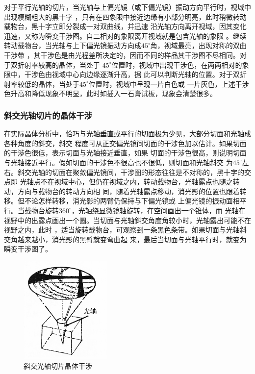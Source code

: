\documentclass[11pt,a4paper]{article}
\begin{document}
\begin{spacing}{1.3}
\begin{CJK*}{UTF8}{gbsn}
对于平行光轴的切片，当光轴与上偏光镜（或下偏光镜）振动方向平行时，视域中出现模糊粗大的黑十字
，只有在四象限中接近边缘有小部分明亮，此时稍微转动载物台，黑十字立即分裂成一对双曲线，并迅速
沿光轴方向离开视域，因其变化迅速，又称为瞬变干涉图。自二相对的象限离开视域就是包含光轴的象限
。继续转动载物台，当光轴与上下偏光镜振动方向成$45^{\circ}$角，视域最亮，出现对称的双曲干涉带
，其干涉色是由光程差所决定的，因而不同的样品其干涉图不尽相同。对于双折射率较高的晶体，当处于
$45^{\circ}$位置时，视域中出现干涉色，在两两相对的象限中，干涉色由视域中心向边缘逐渐升高，据
此可以判断光轴的位置。对于双折射率较低的晶体，当处于$45^{\circ}$位置时，视域中呈现一片白色或
一片灰色，上述干涉色升高和降低现象不明显，此时如插入一石膏试板，现象会清楚很多。\par
\subsubsection{斜交光轴切片的晶体干涉}
在实际晶体分析中，恰巧与光轴垂直或平行的切面极为少见，大部分切面和光轴成各种角度的斜交，斜交
程度可从正交偏光镜间切面的干涉色加以估计。如果切面的干涉色很低，表示切面与光轴接近垂直，如果
切面的干涉色很高，则说明切面与光轴接近平行。假如切面的干涉色不很高也不很低，则切面和光轴斜交
为$45^{\circ}$左右。斜交光轴的切面在聚敛偏光镜间，干涉图的形态往往是不对称的，黑十字的交点即
光轴点不在视域中心，但仍在视域之内，转动载物台，光轴露点也随之转动，方向与载物台的转动方向相
同，随着光轴露点移动，消光影的位置也跟着转移。但不论怎样转移，消光影的两臂仍保持与下偏光镜或
上偏光镜的振动面相平行。当载物台旋转$360^{\circ}$，光轴绕显微镜轴旋转，在空间画出一个锥体，而
光轴在视野中的出露点画出一个圆。当切面与光轴斜交角度角较小时，光轴露出可能不在视野之内，此时
，适当旋转载物台，可观察到一条黑色条带。如果切面与光轴斜交角越来越小，消光影的黑臂就变弯曲起
来，最后当切面与光轴平行时，就变为瞬变干涉图了。
\begin{figure}
\centering
\includegraphics[width=0.4\textwidth]{fig4-1-12}
\caption{斜交光轴切片晶体干涉}
\label{fig:4-1-12}
\end{figure}


\end{CJK*}
\end{spacing}
\end{document}
